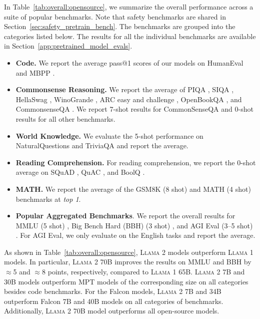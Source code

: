 \documentclass{article}
\newcommand{\anise}{\textsc{Llama 1}\xspace}
\newcommand{\cinnamon}{\textsc{Llama 2}\xspace}
\begin{document}
In Table~\ref{tab:overall:opensource}, we summarize the overall performance across a suite of popular benchmarks. Note that safety benchmarks are shared in Section~\ref{sec:safety_pretrain_bench}. The benchmarks are grouped into the categories listed below. The results for all the individual benchmarks are available in Section~\ref{app:pretrained_model_evals}.
\begin{itemize}
    \item \textbf{Code.} We report the average pass@1 scores of our models on HumanEval \citep{chen2021Evaluating} and MBPP \citep{austin2021program}. 
    \item \textbf{Commonsense Reasoning.} We report the average of PIQA \citep{bisk2020piqa}, SIQA \citep{sap2019socialiqa}, HellaSwag \citep{zellers2019hellaswag}, WinoGrande \citep{sakaguchi2021winogrande}, ARC easy and challenge \citep{clark2018think}, OpenBookQA \citep{mihaylov2018can}, and CommonsenseQA \citep{talmor2018commonsenseqa}. We report 7-shot results for CommonSenseQA and 0-shot results for all other benchmarks. 
    \item \textbf{World Knowledge.} We evaluate the 5-shot performance on NaturalQuestions \citep{kwiatkowski2019natural} and TriviaQA \citep{joshi2017triviaqa} and report the average.
    \item \textbf{Reading Comprehension.}
    For reading comprehension, we report the 0-shot average on SQuAD \citep{rajpurkar2018know}, QuAC \citep{choi2018quac}, and BoolQ \citep{clark2019boolq}.
    \item \textbf{MATH.} We report the average of the GSM8K (8 shot) \citep{cobbe2021training} and MATH (4 shot) \citep{hendrycks2021measuring} benchmarks at \textit{top 1}.
    \item \textbf{Popular Aggregated Benchmarks}. We report the overall results for MMLU (5 shot) \citep{Hendrycks2020MeasuringMM}, Big Bench Hard (BBH) (3 shot) \citep{suzgun2022challenging}, and AGI Eval (3--5 shot) \citep{zhong2023agieval}. 
    For AGI Eval, we only evaluate on the English tasks and report the average. 
\end{itemize}

As shown in Table~\ref{tab:overall:opensource}, \cinnamon models outperform \anise models. In particular, \cinnamon 70B improves the results on MMLU and BBH by $\approx$5 and $\approx$8 points, respectively, compared to \anise 65B. \cinnamon 7B and 30B models outperform MPT models of the corresponding size on all categories besides code benchmarks. For the Falcon models, \cinnamon 7B and 34B outperform Falcon 7B and 40B models on all categories of benchmarks. Additionally, \cinnamon 70B model outperforms all open-source models.
\end{document}
